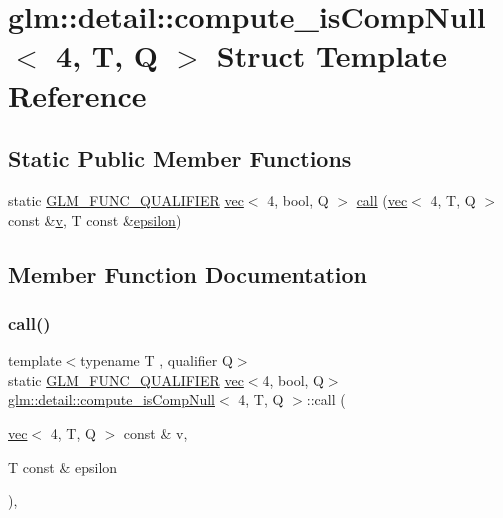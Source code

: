 \hypertarget{structglm_1_1detail_1_1compute__is_comp_null_3_014_00_01_t_00_01_q_01_4}{}\section{glm\+:\+:detail\+:\+:compute\+\_\+is\+Comp\+Null$<$ 4, T, Q $>$ Struct Template Reference}
\label{structglm_1_1detail_1_1compute__is_comp_null_3_014_00_01_t_00_01_q_01_4}
\subsection*{Static Public Member Functions}
\begin{DoxyCompactItemize}
\item 
static \mbox{\hyperlink{setup_8hpp_a33fdea6f91c5f834105f7415e2a64407}{G\+L\+M\+\_\+\+F\+U\+N\+C\+\_\+\+Q\+U\+A\+L\+I\+F\+I\+ER}} \mbox{\hyperlink{structglm_1_1vec}{vec}}$<$ 4, bool, Q $>$ \mbox{\hyperlink{structglm_1_1detail_1_1compute__is_comp_null_3_014_00_01_t_00_01_q_01_4_aff1dc41c1dcdc2849505c73ec3d392ac}{call}} (\mbox{\hyperlink{structglm_1_1vec}{vec}}$<$ 4, T, Q $>$ const \&\mbox{\hyperlink{_s_d_l__opengl_8h_a10a82eabcb59d2fcd74acee063775f90}{v}}, T const \&\mbox{\hyperlink{group__gtc__constants_ga2a1e57fc5592b69cfae84174cbfc9429}{epsilon}})
\end{DoxyCompactItemize}


\subsection{Member Function Documentation}
\mbox{\label{structglm_1_1detail_1_1compute__is_comp_null_3_014_00_01_t_00_01_q_01_4_aff1dc41c1dcdc2849505c73ec3d392ac}} 
\subsubsection{\texorpdfstring{call()}{call()}}
{\footnotesize\ttfamily template$<$typename T , qualifier Q$>$ \\
static \mbox{\hyperlink{setup_8hpp_a33fdea6f91c5f834105f7415e2a64407}{G\+L\+M\+\_\+\+F\+U\+N\+C\+\_\+\+Q\+U\+A\+L\+I\+F\+I\+ER}} \mbox{\hyperlink{structglm_1_1vec}{vec}}$<$4, bool, Q$>$ \mbox{\hyperlink{structglm_1_1detail_1_1compute__is_comp_null}{glm\+::detail\+::compute\+\_\+is\+Comp\+Null}}$<$ 4, T, Q $>$\+::call (\begin{DoxyParamCaption}\item[{\mbox{\hyperlink{structglm_1_1vec}{vec}}$<$ 4, T, Q $>$ const \&}]{v,  }\item[{T const \&}]{epsilon }\end{DoxyParamCaption})\hspace{0.3cm}{\ttfamily [inline]}, {\ttfamily [static]}}



